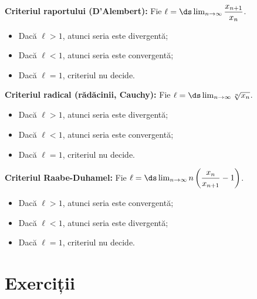 \vspace{1cm}

\textbf{Criteriul raportului (D'Alembert):} Fie $ \ell = \ds\lim_{n \to \infty} \dfrac{x_{n+1}}{x_n} $.
\begin{itemize}
    \item Dacă $ \ell > 1 $, atunci seria este divergentă;
    \item Dacă $ \ell < 1 $, atunci seria este convergentă;
    \item Dacă $ \ell = 1 $, criteriul nu decide.
\end{itemize}

\vspace{1cm}

\textbf{Criteriul radical (rădăcinii, Cauchy):} Fie $ \ell = \ds\lim_{n \to \infty} \sqrt[n]{x_n} $.
\begin{itemize}
    \item Dacă $ \ell > 1 $, atunci seria este divergentă;
    \item Dacă $ \ell < 1 $, atunci seria este convergentă;
    \item Dacă $ \ell = 1 $, criteriul nu decide.
\end{itemize}

\vspace{1cm}

\textbf{Criteriul Raabe-Duhamel:} Fie 
$ \ell = \ds\lim_{n \to \infty} n \left( \dfrac{x_n}{x_{n + 1}} - 1 \right) $.
\begin{itemize}
    \item Dacă $ \ell > 1 $, atunci seria este convergentă;
    \item Dacă $ \ell < 1 $, atunci seria este divergentă;
    \item Dacă $ \ell = 1 $, criteriul nu decide.
\end{itemize}

\section{Exerciții}

